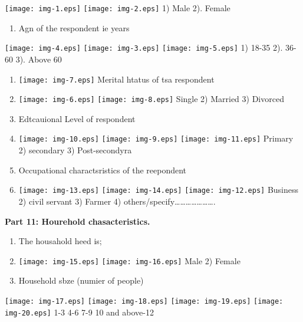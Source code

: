\documentclass[12pt]{article}
\begin{document}
\texttt{[image: img-1.eps]}{\small 
\texttt{[image: img-2.eps]} }1) Male                         2).
Female

\begin{enumerate}
	\item Agn of the respondent ie years
\end{enumerate}

\texttt{[image: img-4.eps]}{\small 
\texttt{[image: img-3.eps]} \texttt{[image: img-5.eps]}
}1) 18-35           2). 36-60           3). Above 60

\begin{enumerate}
	\item \texttt{[image: img-7.eps]} Merital htatus of tsa respondent
	\item \texttt{[image: img-6.eps]} \texttt{[image: img-8.eps]}
Single          2) Married              3) Divorced
	\item Edtcauional Level of respondent
	\item \texttt{[image: img-10.eps]} \texttt{[image: img-9.eps]}
\texttt{[image: img-11.eps]} Primary            2) secondary         
 3) Post-secondyra
	\item Occupational charactsristics of the reepondent
	\item \texttt{[image: img-13.eps]}
\texttt{[image: img-14.eps]} \texttt{[image: img-12.eps]}
Business           2) civil servant          3) Farmer        4)
others/specify\ldots{}\ldots{}\ldots{}\ldots{}\ldots{}\ldots{}\ldots{}.
\end{enumerate}

\textbf{Part 11: Hourehold chasacteristics.}

\begin{enumerate}
	\item The housahold heed is;
	\item \texttt{[image: img-15.eps]}
\texttt{[image: img-16.eps]} Male               2) Female
	\item Household sbze (numier of people)
\end{enumerate}

\texttt{[image: img-17.eps]}
\texttt{[image: img-18.eps]} \texttt{[image: img-19.eps]}
\texttt{[image: img-20.eps]} 1-3          4-6         7-9          10
and above-12
\end{document}
